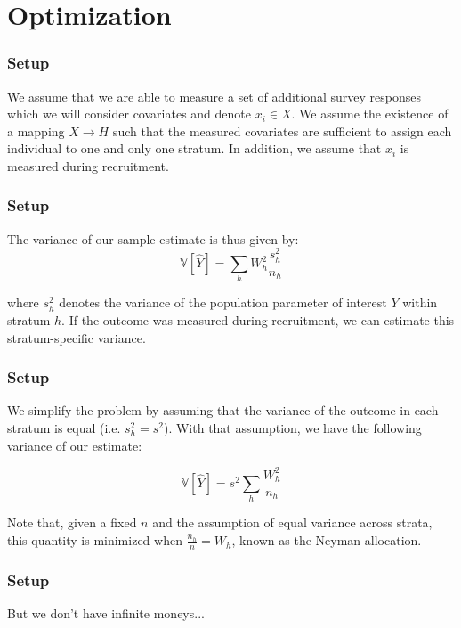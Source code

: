 \documentclass[aspectratio=169]{beamer}
\begin{document}
\section{Optimization}

\begin{frame}

\frametitle{Setup}

We assume that we are able to measure a set of additional survey responses which we will consider covariates and denote $x_i \in X$. We assume the existence of a mapping $X \rightarrow H$ such that the measured covariates are sufficient to assign each individual to one and only one stratum. In addition, we assume that $x_i$ is measured during recruitment.

\end{frame}
\begin{frame}
\frametitle{Setup}

The variance of our sample estimate is thus given by:
$$
\mathbb{V}[\hat{Y}] =  \sum_{h}  W_h^2 \frac{s_h^2}{n_h}
$$

where $s_h^2$ denotes the variance of the population parameter of interest $Y$ within stratum $h$. If the outcome was measured during recruitment, we can estimate this stratum-specific variance.

\end{frame}
\begin{frame}
\frametitle{Setup}

We simplify the problem by assuming that the variance of the outcome in each stratum is equal (i.e. $s_h^2 = s^2$). With that assumption, we have the following variance of our estimate:

$$
\mathbb{V}[\hat{Y}] =  s^2  \sum_{h}  \frac{W_h^2}{n_h}
$$

Note that, given a fixed $n$ and the assumption of equal variance across strata, this quantity is minimized when $\frac{n_h}{n} = W_h$, known as the Neyman allocation.

\end{frame}


\begin{frame}
\frametitle{Setup}

But we don't have infinite moneys...

\end{frame}
\end{document}
